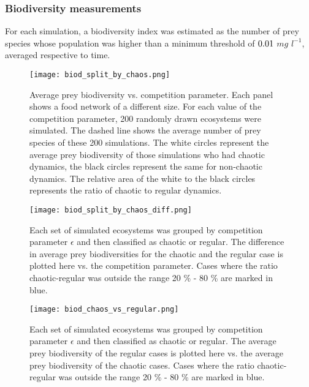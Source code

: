 \subsubsection{Biodiversity measurements}
\label{subsubsec:BiodiversityFigs}

For each simulation, a biodiversity index was estimated as the number of prey species whose population was higher than a minimum threshold of $0.01$ $mg$ $l^{-1}$, averaged respective to time.

\begin{figure}[H]
	\begin{center}
		\texttt{[image: biod\_split\_by\_chaos.png]}
	\end{center}
	\caption{Average prey biodiversity vs. competition parameter. Each panel shows a food network of a different size. For each value of the competition parameter, 200 randomly drawn ecosystems were simulated. The dashed line shows the average number of prey species of these 200 simulations. The white circles represent the average prey biodiversity of those simulations who had chaotic dynamics, the black circles represent the same for non-chaotic dynamics. The relative area of the white to the black circles represents the ratio of chaotic to regular dynamics.}
	\label{fig:BiodSplitByChaos}
\end{figure}

\begin{figure}[H]
	\begin{center}
		\texttt{[image: biod\_split\_by\_chaos\_diff.png]}
	\end{center}
	\caption{Each set of simulated ecosystems was grouped by competition parameter $\epsilon$ and then classified as chaotic or regular. The difference in average prey biodiversities for the chaotic and the regular case is plotted here vs. the competition parameter. Cases where the ratio chaotic-regular was outside the range 20 \% - 80 \% are marked in blue.}
	\label{fig:BiodSplitByChaosDiff}
\end{figure}

\begin{figure}[H]
	\begin{center}
		\texttt{[image: biod\_chaos\_vs\_regular.png]}
	\end{center}
	\caption{Each set of simulated ecosystems was grouped by competition parameter $\epsilon$ and then classified as chaotic or regular. The average prey biodiversity of the regular cases is plotted here vs. the average prey biodiversity of the chaotic cases. Cases where the ratio chaotic-regular was outside the range 20 \% - 80 \% are marked in blue.}
	\label{fig:BiodChaosVsRegular}
\end{figure}

